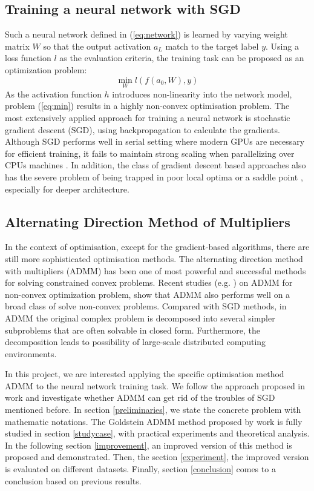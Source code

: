 \documentclass[letterpaper, 10 pt, conference]{ieeeconf}  %
\begin{document}
\subsection{Training a neural network with SGD }
Such a neural network defined in (\ref{eq:network}) is learned by varying weight matrix $W$ so that the output activation $a_L$ match to the target label $y$. Using a loss function $l$ as the evaluation criteria, the training task can be proposed as an optimization problem:
\begin{equation} \label{eq:min}
	\min_{W} l(f(a_0, W), y)
\end{equation}
As the activation function $h$ introduces non-linearity into the network model, problem (\ref{eq:min}) results in a highly non-convex optimisation problem. The most extensively applied approach for training a neural network is stochastic gradient descent (SGD), using backpropagation to calculate the gradients.  Although SGD performs well in serial setting where modern GPUs are necessary for efficient training, it fails to maintain strong scaling when parallelizing over CPUs machines \cite{2}. In addition, the class of gradient descent based approaches also has the severe problem of being trapped in poor local optima \cite{3} or a saddle point \cite{4}, especially for deeper architecture. 

\subsection{Alternating Direction Method of Multipliers}
In the context of optimisation, except for the gradient-based algorithms, there are still more sophisticated optimisation methods. The alternating direction method with multipliers (ADMM) has been one of most powerful and successful methods for solving constrained convex problems. Recent studies (e.g. \cite{5, 6, 7, 8}) on ADMM for non-convex optimization problem, show that ADMM also performs well on a broad class of solve non-convex problems. Compared with SGD methods, in ADMM the original complex problem is decomposed into several simpler subproblems that are often solvable in closed form. Furthermore, the decomposition leads to possibility of large-scale distributed computing environments.

In this project, we are interested applying the specific optimisation method ADMM to the neural network training task. We follow the approach proposed in work \cite{9} and investigate whether ADMM can get rid of the troubles of SGD mentioned before.  In section \ref{preliminaries}, we state the concrete problem with mathematic notations. The Goldstein ADMM method proposed by work \cite{9} is fully studied in section \ref{studycase}, with practical experiments and theoretical analysis. In the following section \ref{improvement}, an improved version of this method is proposed and demonstrated. Then, the section \ref{experiment}, the improved version is evaluated on different datasets. Finally, section \ref{conclusion} comes to a conclusion based on previous results.
\end{document}
